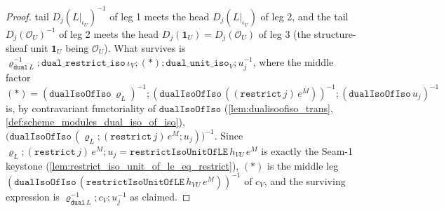 \begin{proof}
  tail \(D_j(L|_{\iota_U})^{-1}\) of leg 1 meets the head \(D_j(L|_{\iota_U})\) of leg 2, and the tail
  \(D_j(\mathcal O_U)^{-1}\) of leg 2 meets the head \(D_j(\mathbf 1_U) = D_j(\mathcal O_U)\) of leg 3
  (the structure-sheaf unit \(\mathbf 1_U\) being \(\mathcal O_U\)). What survives is
  \(\varrho_{\mathtt{dual}\,L}^{-1} \mathbin{;} \mathtt{dual\_restrict\_iso}\,\iota_V \mathbin{;} (\ast)
  \mathbin{;} \mathtt{dual\_unit\_iso}_V \mathbin{;} u_j^{-1}\), where the middle factor
  \((\ast) = (\mathtt{dualIsoOfIso}\,\varrho_L)^{-1} \mathbin{;}
  (\mathtt{dualIsoOfIso}\,((\mathtt{restrict}\,j)\,e^M))^{-1} \mathbin{;} (\mathtt{dualIsoOfIso}\,u_j)^{-1}\)
  is, by contravariant functoriality of \(\mathtt{dualIsoOfIso}\) (\cref{lem:dualisoofiso_trans},
  \cref{def:scheme_modules_dual_iso_of_iso}),
  \(\bigl(\mathtt{dualIsoOfIso}\,(\varrho_L \mathbin{;} (\mathtt{restrict}\,j)\,e^M \mathbin{;} u_j)\bigr)^{-1}\).
  Since \(\varrho_L \mathbin{;} (\mathtt{restrict}\,j)\,e^M \mathbin{;} u_j
    = \mathtt{restrictIsoUnitOfLE}\,h_{VU}\,e^M\) is exactly the Seam-1 keystone
  (\cref{lem:restrict_iso_unit_of_le_eq_restrict}), \((\ast)\) is the middle leg
  \((\mathtt{dualIsoOfIso}\,(\mathtt{restrictIsoUnitOfLE}\,h_{VU}\,e^M))^{-1}\) of \(c_V\), and the
  surviving expression is \(\varrho_{\mathtt{dual}\,L}^{-1} \mathbin{;} c_V \mathbin{;} u_j^{-1}\) as claimed.
\end{proof}

